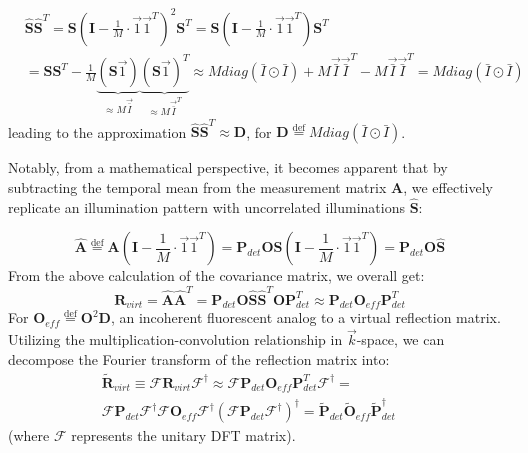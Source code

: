 \documentclass[pdflatex,sn-mathphys-num,Numbered]{sn-jnl}%
\theoremstyle{thmstyleone}%
\theoremstyle{thmstyletwo}%
\theoremstyle{thmstylethree}%
\begin{document}
\begin{align}
&\hat{\textbf{S}} \hat{\textbf{S}}^T = \textbf{S}(\mathbf{I}-\frac{1}{M}\cdot\vec{1}\vec{1}^T)^2\textbf{S}^T = \textbf{S}(\mathbf{I}-\frac{1}{M}\cdot\vec{1}\vec{1}^T)\textbf{S}^T \nonumber &\\ &= \textbf{S}\textbf{S}^T-\frac{1}{M}
\underbrace{(\textbf{S}\vec{1})}_{\approx M\vec{\bar{I}}}
\underbrace{(\textbf{S}\vec{1})^T}_{\approx M\vec{\bar{I}}^T}\approx Mdiag(\bar{I}\odot \bar{I}) + M\vec{\bar{I}}\vec{\bar{I}}^T- M\vec{\bar{I}}\vec{\bar{I}}^T = Mdiag(\bar{I}\odot \bar{I}) &
\label{eq:2}
\tag{S2}
\end{align}
leading to the approximation ${\hat{\textbf{S}}} \hat{\textbf{S}}^T \approx \textbf{D}$, for $\textbf{D}\stackrel{\text{def}} =  Mdiag(\bar{I}\odot \bar{I})$.


Notably, from a mathematical perspective, it becomes apparent that by subtracting the temporal mean from the measurement matrix $\textbf{A}$, we effectively replicate an illumination pattern with uncorrelated illuminations $\hat{\textbf{S}}$:

\begin{equation}
\hat{\textbf{A}}\stackrel{\text{def}} = {\textbf{A}}(\mathbf{I}-\frac{1}{M}\cdot\vec{1}\vec{1}^T) = {\textbf{P}_{det}}{\textbf{O}}{\textbf{S}}(\mathbf{I}-\frac{1}{M}\cdot\vec{1}\vec{1}^T)
 = {\textbf{P}_{det}}{\textbf{O}}\hat{\textbf{S}}
 \label{eq:3}
\tag{S3}
\end{equation}
From the above calculation of the covariance matrix, we overall get:
\begin{equation}
\textbf{R}_{virt}=\hat{\textbf{A}}\hat{\textbf{A}}^T = {\textbf{P}_{det}}\textbf{O}\hat{\textbf{S}}\hat{\textbf{S}}^T\textbf{O}\textbf{P}_{det}^T \approx \textbf{P}_{det}{\textbf{O}_{eff}} \textbf{P}_{det}^T
\tag{S4}
\label{eq:4}
\end{equation}
For $\textbf{O}_{eff}\stackrel{\text{def}}=\textbf{O}^2 \textbf{D}$, an incoherent fluorescent analog to a virtual reflection matrix.
Utilizing the multiplication-convolution relationship in $\vec{k}$-space, we can decompose the Fourier transform of the reflection matrix into: 
\begin{align}
\tag{S5}
\label{eq:5}
\tilde{\textbf{R}}_{virt}\equiv\mathcal{F}\textbf{R}_{virt}\mathcal{F}^{\dagger} \approx  \mathcal{F}\textbf{P}_{det}{\textbf{O}_{eff}} \textbf{P}_{det}^T\mathcal{F}^{\dagger} = &&  \\ \nonumber 
\mathcal{F}\textbf{P}_{det}\mathcal{F}^{\dagger}\mathcal{F}\textbf{O}_{eff}\mathcal{F}^{\dagger}(\mathcal{F}\textbf{P}_{det}\mathcal{F}^{\dagger})^{\dagger}={\tilde{\textbf{P}}_{det}}{\tilde{\textbf{O}}_{eff}}{\tilde{\textbf{P}}^{\dagger}_{det}}
\end{align}
(where $\mathcal{F}$ represents the unitary DFT matrix).
\end{document}
